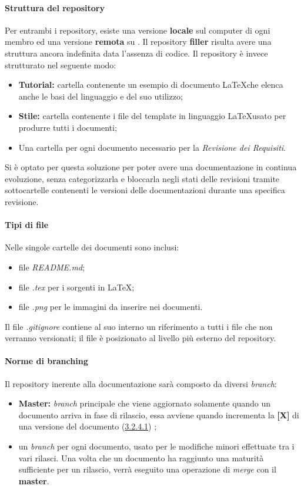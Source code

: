 \paragraph{Struttura del repository}
Per entrambi i repository, esiste una versione \textbf{locale} sul computer di ogni membro ed una versione \textbf{remota} su .\newline
Il repository \textbf{filler} risulta avere una struttura ancora indefinita data l'assenza di codice.\newline
Il repository \textbf{\repoDoc} è invece strutturato nel seguente modo:
\begin{itemize}
	\item \textbf{Tutorial:} cartella contenente un esempio di documento \LaTeX che elenca anche le basi del linguaggio e del suo utilizzo; 
	\item \textbf{Stile:} cartella contenente i file del template in linguaggio \LaTeX usato per produrre tutti i documenti;
	\item Una cartella per ogni documento necessario per la \textit{Revisione dei Requisiti}.
\end{itemize}
Si è optato per questa soluzione per poter avere una documentazione in continua evoluzione, senza categorizzarla e bloccarla negli stati delle revisioni tramite sottocartelle contenenti le versioni delle documentazioni durante una specifica revisione.
\paragraph{Tipi di file}
Nelle singole cartelle dei documenti sono inclusi:
\begin{itemize}
\item file \textit{README.md};
\item file \textit{.tex} per i sorgenti in \LaTeX; 
\item file \textit{.png} per le immagini da inserire nei documenti.
\end{itemize}
Il file \textit{.gitignore} contiene al suo interno un riferimento a tutti i file che non verranno versionati; il file è posizionato al livello più esterno del repository.
\paragraph{Norme di branching}
\label{NormeBranching}
Il repository inerente alla documentazione sarà composto da diversi \textit{branch}:
\begin{itemize}
	\item \textbf{Master:} \textit{branch} principale che viene aggiornato solamente quando un documento arriva in fase di rilascio, essa avviene quando incrementa la \textbf{[X]} di una versione del documento (\hyperref[cod-versionamento]{3.2.4.1})	;
	\item un \textit{branch} per ogni documento, usato per le modifiche minori effettuate tra i vari rilasci. Una volta che un documento ha raggiunto una maturità sufficiente per un rilascio, verrà eseguito una operazione di \textit{merge} con il \textbf{master}.
\end{itemize}
